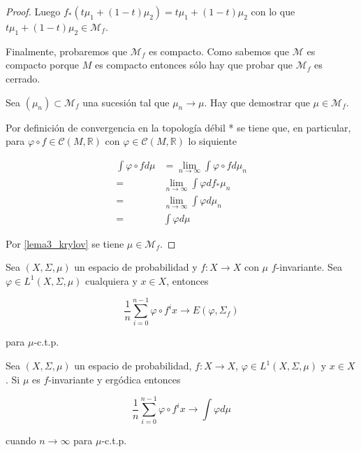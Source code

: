 \begin{proof}
	Luego $f_*(t\mu_1 + (1-t)\mu_2) = t\mu_1 + (1-t)\mu_2$ con lo que $t\mu_1 + (1-t)\mu_2 \in \mathcal{M}_f$.
	
	Finalmente, probaremos que $\mathcal{M}_f$ es compacto. Como sabemos que $\mathcal{M}$ es compacto porque $M$ es compacto entonces sólo hay que probar que $\mathcal{M}_f$ es cerrado.
	
	Sea $(\mu_n) \subset \mathcal{M}_f$ una sucesión tal que $\mu_n \rightarrow \mu$. Hay que demostrar que $\mu \in \mathcal{M}_f$.
	
	Por definición de convergencia en la topología débil * se tiene que, en particular, para $\varphi \circ f \in \mathcal{C}(M,\mathbb{R})$ con $\varphi \in \mathcal{C}(M,\mathbb{R})$ lo siquiente
	
	\begin{align}
	\int \varphi \circ f d\mu &= \lim_{n \rightarrow \infty} \int \varphi \circ f d\mu_n\\
	=& \lim_{n \rightarrow \infty} \int \varphi df_*\mu_n\\
	=& \lim_{n \rightarrow \infty} \int \varphi d\mu_n\\
	=& \int \varphi d\mu
	\end{align}
	
	Por \ref{lema3_krylov} se tiene $\mu \in \mathcal{M}_f$.
\end{proof}

\begin{lema}\label{birkhoff-lema}
	Sea $(X,\Sigma,\mu)$ un espacio de probabilidad y $f: X \rightarrow X$ con $\mu$ $f$-invariante. Sea $\varphi \in L^1(X,\Sigma,\mu)$ cualquiera y $x \in X$, entonces
	
	\begin{equation}
		\frac{1}{n} \sum_{i=0}^{n-1} \varphi \circ f^i x \rightarrow E(\varphi,\Sigma_f)
	\end{equation}
	
	para $\mu$-c.t.p.
	
\end{lema}

\begin{teorema}\label{birkhoff_thm}
	Sea $(X,\Sigma,\mu)$ un espacio de probabilidad, $f: X \rightarrow X$, $\varphi \in L^1(X,\Sigma,\mu)$ y $x \in X$. Si $\mu$ es $f$-invariante y ergódica entonces
	
	\begin{equation}
		\frac{1}{n} \sum_{i=0}^{n-1} \varphi \circ f^i x \rightarrow \int \varphi d\mu
	\end{equation}
	
	cuando $n \rightarrow \infty$ para $\mu$-c.t.p.
\end{teorema}

